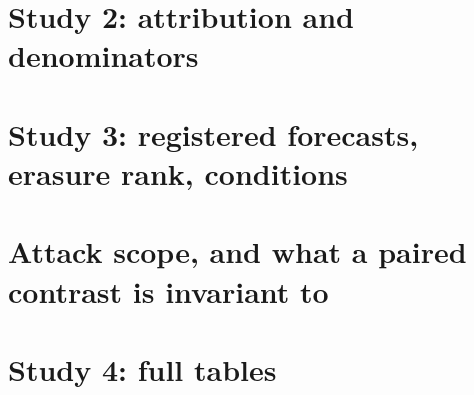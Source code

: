 \documentclass[10pt]{article}
\begin{document}
\section{Study 2: attribution and denominators}
\label{app:study2}
\begin{center}\small\end{center}
\begin{center}\small\end{center}
\begin{center}\small\end{center}
\begin{center}\scriptsize\end{center}

\section{Study 3: registered forecasts, erasure rank, conditions}
\label{app:study3}
\begin{center}\small\end{center}
\noindent\footnotesize\noteErasureRank\normalsize
\begin{center}\small\end{center}

\section{Attack scope, and what a paired contrast is invariant to}
\label{app:scope}
\begin{center}\small\end{center}
\noindent\footnotesize\noteScopeDecomposition\normalsize

\section{Study 4: full tables}
\label{app:study4}
\begin{table}[h]
\centering\scriptsize

\caption{Study~4 panel on 2017, scope \texttt{common\_fresh}, budget 360, unweighted seed means. 66 of 69
declared interfaces scored (23 newly transported conditions $\times$ 3 seeds; references $H$, $A_0$, $J$
excluded from that count); the three absent are the infeasible width-8 SPLINCE arm.
\noteStudyFourFrontierSeventeen}
\end{table}
\begin{table}[h]
\centering\small

\caption{From nominal slots to distinct new systems. \noteStudyFourAccounting}
\label{tab:s4accounting}
\end{table}
\begin{table}[h]
\centering\small

\caption{Erasure rank on the new channels, measured. \noteStudyFourErasure}
\label{tab:s4rank}
\end{table}
\end{document}
